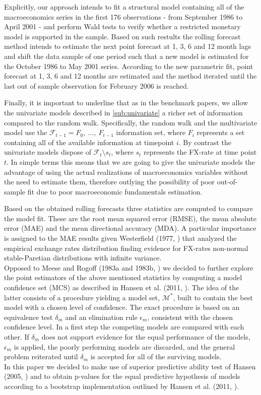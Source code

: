 Explicitly, our approach intends to fit a structural model containing all of the macroeconomics
series in the first 176 observations - from September 1986 to April 2001 - and perform Wald
tests to verify whether a restricted monetary model is supported in the sample. Based on such restults
the rolling forecast method intends to estimate the next point forecast at 1, 3, 6 and 12 month lags
and shift the data sample of one period such that a new model is estimated for
the October 1986 to May 2001 series. According to the new parametric fit,
point forecast at 1, 3, 6 and 12 months are estimated and the method iterated until the last out of sample
observation for February 2006 is reached.

Finally, it is important to underline that as in the benchmark papers, we allow the univariate models
described in \ref{sub:univariate} a richer set of information compared to the random walk.
Specifically, the random walk and the multivariate model use the $\mathscr{F}_{t-1} = {F_0, \ \dots, \ F_{t-1}}$
information set, where $F_i$ represents a set containing all of the available information at timepoint $i$.
By contrast the univariate models dispose of $\mathscr{F}_t \setminus s_t$, where $s_t$ represents
the FX-rate at time point $t$.
In simple terms this means that we are going to give the univariate models the advantage of using the actual realizations of
macroeconomics variables without the need to estimate them, therefore outlying the possibility of poor out-of-sample fit
due to poor macroeconomic fundamentals estimation. 

Based on the obtained rolling forecasts three statistics are computed to compare the model fit.
These are the root mean squared error (RMSE), the mean absolute error (MAE) and the mean directional accuracy (MDA).
A particular importance is assigned to the MAE results given Westerfield (1977, \cite{Westerfield})
that analyzed the empirical exchange rates distribution finding evidence for FX-rates
non-normal stable-Paretian distributions with infinite variance.\\
Opposed to Meese and Rogoff (1983a and 1983b, \cite{MeeseRogoffa, MeeseRogoffb}) we decided
to further explore the point estimators of the above mentioned statistics by computing a model confidence set (MCS)
as described in Hansen et al. (2011, \cite{HansenMCS}).
The idea of the latter consists of a procedure yielding a model set, $\mathcal{M}^*$, built to contain the
best model with a chosen level of confidence. The exact procedure is based on an equivalence test $\delta_m$ and an
elimination rule $\epsilon_m$, consistent with the chosen confidence level. In a first step the competing models are
compared with each other. If $\delta_m$ does not support evidence for the equal performance of the models, $\epsilon_m$
is applied, the poorly performing models are discarded, and the general problem reiterated until $\delta_m$ is accepted
for all of the surviving models.\\
In this paper we decided to make use of superior predictive ability test of Hansen (2005, \cite{HansenSPA})
and to obtain p-values for the equal predictive hypothesis of models according to a bootstrap implementation
outlined by Hansen et al. (2011, \cite{HansenMCS}).